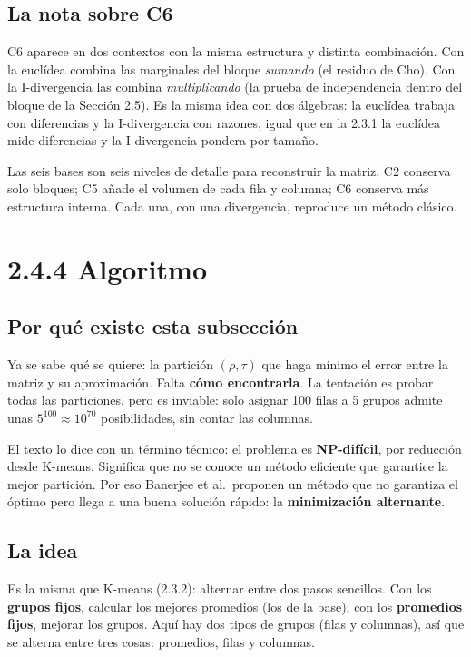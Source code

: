 \documentclass[11pt,a4paper]{article}
\newenvironment{idea}{\par\begin{center}\begin{lrbox}{\ideabox}\begin{minipage}{0.9\linewidth}}{\end{minipage}\end{lrbox}\fcolorbox{blue!40!black}{blue!5}{\usebox{\ideabox}}\end{center}}
\begin{document}
\subsection{La nota sobre C6}

C6 aparece en dos contextos con la misma estructura y distinta combinación. Con la
euclídea combina las marginales del bloque \emph{sumando} (el residuo de Cho). Con
la I-divergencia las combina \emph{multiplicando} (la prueba de independencia
dentro del bloque de la Sección 2.5). Es la misma idea con dos álgebras: la
euclídea trabaja con diferencias y la I-divergencia con razones, igual que en la
2.3.1 la euclídea mide diferencias y la I-divergencia pondera por tamaño.

\begin{idea}
Las seis bases son seis niveles de detalle para reconstruir la matriz. C2 conserva
solo bloques; C5 añade el volumen de cada fila y columna; C6 conserva más
estructura interna. Cada una, con una divergencia, reproduce un método clásico.
\end{idea}

\section{2.4.4 Algoritmo}

\subsection{Por qué existe esta subsección}

Ya se sabe qué se quiere: la partición $(\rho,\tau)$ que haga mínimo el error entre
la matriz y su aproximación. Falta \textbf{cómo encontrarla}. La tentación es
probar todas las particiones, pero es inviable: solo asignar 100 filas a 5 grupos
admite unas $5^{100}\approx10^{70}$ posibilidades, sin contar las columnas.

El texto lo dice con un término técnico: el problema es \textbf{NP-difícil}, por
reducción desde K-means. Significa que no se conoce un método eficiente que
garantice la mejor partición. Por eso Banerjee et al.\ proponen un método que no
garantiza el óptimo pero llega a una buena solución rápido: la
\textbf{minimización alternante}.

\subsection{La idea}

Es la misma que K-means (2.3.2): alternar entre dos pasos sencillos. Con los
\textbf{grupos fijos}, calcular los mejores promedios (los de la base); con los
\textbf{promedios fijos}, mejorar los grupos. Aquí hay dos tipos de grupos (filas
y columnas), así que se alterna entre tres cosas: promedios, filas y columnas.
\end{document}

